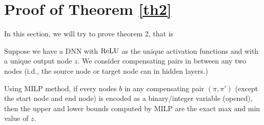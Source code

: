 				
				
				\section{Proof of Theorem \ref{th2}}
				
				In this section, we will try to prove theorem 2, that is 
				
				\begin{theorem}
					\label{no_diamond_3}
					
					Suppose we have a DNN with $\mathrm{ReLU}$ as the unique activation functions and with a unique output node $z$. We consider compensating pairs in between any two nodes (i.d., the source node or target node can in hidden layers.)
					
					Using MILP method, if every nodes $b$ in any compensating pair
					$(\pi,\pi')$ (except the start node and end node) is encoded as a binary/integer variable (opened), then the upper and lower 
					bounds computed by MILP are the exact max and min value of $z$.
				\end{theorem}
				
